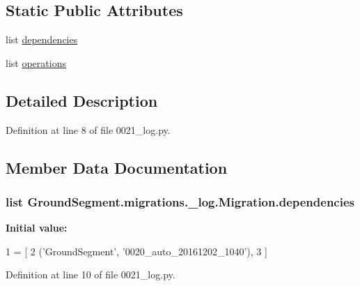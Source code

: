 \subsection*{Static Public Attributes}
\begin{DoxyCompactItemize}
\item 
list \hyperlink{class_ground_segment_1_1migrations_1_10021__log_1_1_migration_aded810dca6d276bdc28d3807f453e66c}{dependencies}
\item 
list \hyperlink{class_ground_segment_1_1migrations_1_10021__log_1_1_migration_a429ec7a18555ddbde877be5a7445f190}{operations}
\end{DoxyCompactItemize}


\subsection{Detailed Description}


Definition at line 8 of file 0021\+\_\+log.\+py.



\subsection{Member Data Documentation}
\hypertarget{class_ground_segment_1_1migrations_1_10021__log_1_1_migration_aded810dca6d276bdc28d3807f453e66c}{}
\subsubsection[{dependencies}]{\setlength{\rightskip}{0pt plus 5cm}list Ground\+Segment.\+migrations.\+\_\+log.\+Migration.\+dependencies\hspace{0.3cm}{\ttfamily [static]}}\label{class_ground_segment_1_1migrations_1_10021__log_1_1_migration_aded810dca6d276bdc28d3807f453e66c}
{\bfseries Initial value\+:}
\begin{DoxyCode}
1 = [
2         (\textcolor{stringliteral}{'GroundSegment'}, \textcolor{stringliteral}{'0020\_auto\_20161202\_1040'}),
3     ]
\end{DoxyCode}


Definition at line 10 of file 0021\+\_\+log.\+py.

